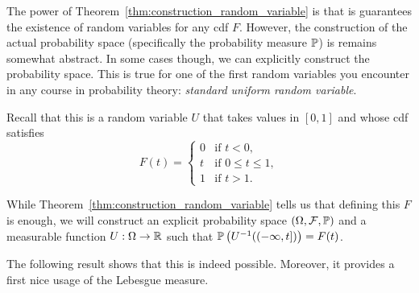 %
%
%


The power of Theorem~\ref{thm:construction_random_variable} is that is guarantees the existence of random variables for any cdf $F$. However, the construction of the actual probability space (specifically the probability measure $\mathbb P$) is remains somewhat abstract. In some cases though, we can explicitly construct the probability space. This is true for one of the first random variables you encounter in any course in probability theory: \emph{standard uniform random variable}. 

Recall that this is a random variable $U$ that takes values in $[0,1]$ and whose cdf satisfies 
\begin{equation}\label{eq:cdf_uniform_rv}
	F(t) = \begin{cases}
		0 &\text{if } t < 0,\\
		t &\text{if } 0 \le t\le 1,\\
		1 &\text{if } t > 1.
	\end{cases}
\end{equation}

While Theorem~\ref{thm:construction_random_variable} tells us that defining this $F$ is enough, we will construct an explicit probability space $(\Omega,\mathcal F, \mathbb P)$ and a measurable function $U : \Omega \to \mathbb R$ such that $	\mathbb P\left(U^{-1}((-\infty,t])\right) = F(t)$.

The following result shows that this is indeed possible. Moreover, it provides a first nice usage of the Lebesgue measure.

